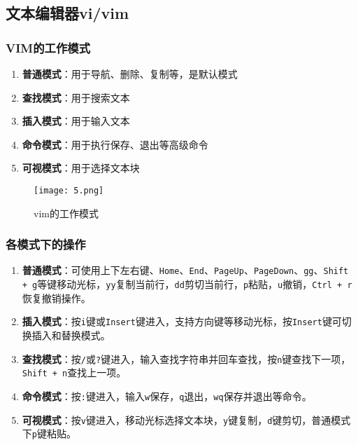 \subsection{文本编辑器vi/vim}

\subsubsection{VIM的工作模式}
\begin{enumerate}
    \item \textbf{普通模式}：用于导航、删除、复制等，是默认模式
    \item \textbf{查找模式}：用于搜索文本
    \item \textbf{插入模式}：用于输入文本
    \item \textbf{命令模式}：用于执行保存、退出等高级命令
    \item \textbf{可视模式}：用于选择文本块
\end{enumerate}

\begin{figure}[H]
    \centering
    \captionsetup{skip=4pt}
    \texttt{[image: 5.png]}
    \caption{vim的工作模式}
\end{figure}

\subsubsection{各模式下的操作}
\begin{enumerate}[label=\arabic*.]
    \item \textbf{普通模式}：可使用上下左右键、\texttt{Home}、\texttt{End}、\texttt{PageUp}、\texttt{PageDown}、\texttt{gg}、\texttt{Shift + g}等键移动光标，\texttt{yy}复制当前行，\texttt{dd}剪切当前行，\texttt{p}粘贴，\texttt{u}撤销，\texttt{Ctrl + r}恢复撤销操作。
    \item \textbf{插入模式}：按\texttt{i}键或\texttt{Insert}键进入，支持方向键等移动光标，按\texttt{Insert}键可切换插入和替换模式。
    \item \textbf{查找模式}：按\texttt{/}或\texttt{?}键进入，输入查找字符串并回车查找，按\texttt{n}键查找下一项，\texttt{Shift + n}查找上一项。
    \item \textbf{命令模式}：按\texttt{:}键进入，输入\texttt{w}保存，\texttt{q}退出，\texttt{wq}保存并退出等命令。
    \item \textbf{可视模式}：按\texttt{v}键进入，移动光标选择文本块，\texttt{y}键复制，\texttt{d}键剪切，普通模式下\texttt{p}键粘贴。
\end{enumerate}

